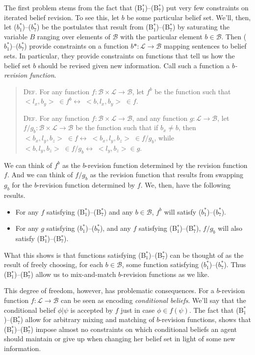 The first problem stems from the fact that (B$^*_1$)--(B$^*_7$) put very few constraints on iterated belief revision.
To see this, let $b$ be some particular belief set.
We'll, then, let ($b^*_1$)--($b^*_7$) be the postulates that result from (B$^*_1$)--(B$^*_7$) by saturating the variable $B$ ranging over elements of $\mathcal{B}$ with the particular element $b \in \mathcal{B}$.
Then ($b^*_1$)--($b^*_7$) provide constraints on a function $b*: \mathcal{L} \rightarrow \mathcal{B}$ mapping sentences to belief sets.
In particular, they provide constraints on functions that tell us how the belief set $b$ should be revised given new information.
Call such a function a \textit{$b$-revision function}.
\begin{quote}
\textsc{Def.}\; For any function $f: \mathcal{B} \times \mathcal{L} \rightarrow \mathcal{B}$, let $f^b$ be the function such that $< l_x, b_y > \; \in f^b \leftrightarrow \; < b, l_x, b_y > \; \in f$.

\textsc{Def.}\; For any function $f: \mathcal{B} \times \mathcal{L} \rightarrow \mathcal{B}$, and any function $g: \mathcal{L} \rightarrow \mathcal{B}$, let $f/g_b: \mathcal{B} \times \mathcal{L} \rightarrow \mathcal{B}$ be the function such that if $b_x \neq b$, then $< b_x, l_y, b_z > \; \in f \leftrightarrow \; < b_x, l_y, b_z > \; \in f/g_b$, while $< b, l_y, b_z > \; \in f/g_b \leftrightarrow \; <  l_y, b_z > \in g$.
\end{quote}

We can think of $f^b$ as the $b$-revision function determined by the revision function $f$.
And we can think of $f/g_b$ as the revision function that results from swapping $g_b$ for the $b$-revision function determined by $f$.
We, then, have the following results.
\begin{itemize}
\item For any $f$ satisfying (B$^*_1$)--(B$^*_7$) and any $b \in \mathcal{B}$, $f^b$ will satisfy ($b^*_1$)--($b^*_7$).
\item For any $g$ satisfying ($b^*_1$)--($b^*_7$), and any $f$ satisfying (B$^*_1$)--(B$^*_7$), $f/g_b$ will also satisfy (B$^*_1$)--(B$^*_7$).
\end{itemize}
What this shows is that functions satisfying (B$^*_1$)--(B$^*_7$) can be thought of as the result of freely choosing, for each $b \in \mathcal{B}$, some function satisfying ($b^*_1$)--($b^*_7$).
Thus (B$^*_1$)--(B$^*_7$) allow us to mix-and-match $b$-revision functions as we like.

This degree of freedom, however, has problematic consequences.
For a $b$-revision function $f: \mathcal{L} \rightarrow \mathcal{B}$ can be seen as encoding  \textit{conditional beliefs}. 
We'll say that the conditional belief $\phi | \psi$ is accepted by $f$ just in case $\phi \in f(\psi)$.
The fact that (B$^*_1$)--(B$^*_7$) allow for arbitrary mixing and matching of $b$-revision functions, shows that (B$^*_1$)--(B$^*_7$) impose almost no constraints on which conditional beliefs an agent should maintain or give up when changing her belief set in light of some new information.


